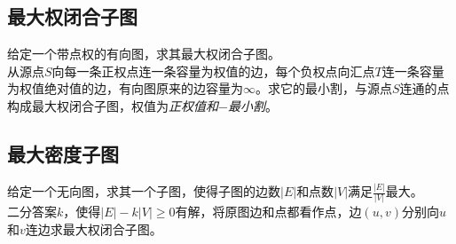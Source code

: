 	\subsection*{最大权闭合子图}
		给定一个带点权的有向图，求其最大权闭合子图。
		\\从源点$ S $向每一条正权点连一条容量为权值的边，每个负权点向汇点$ T $连一条容量为权值绝对值的边，有向图原来的边容量为$ \infty $。求它的最小割，与源点$ S $连通的点构成最大权闭合子图，权值为\textit{正权值和}$ - $\textit{最小割}。
	\subsection*{最大密度子图}
		给定一个无向图，求其一个子图，使得子图的边数$ \left| E \right| $和点数$ \left| V \right| $满足$ \frac{\left| E \right|}{\left| V \right|} $最大。
		\\二分答案$ k $，使得$ \left| E \right| - k \left| V \right| \geq 0 $有解，将原图边和点都看作点，边$ (u, v) $分别向$ u $和$ v $连边求最大权闭合子图。
		
